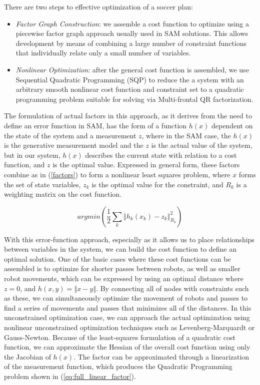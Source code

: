 \documentclass[a4paper, 10pt, conference]{ieeeconf}      %
\begin{document}
There are two steps to effective optimization of a soccer plan:
\begin{itemize}
 \item \textit{Factor Graph Construction}: we assemble a cost function to optimize using a piecewise factor graph approach usually used in SAM solutions.  This allows development by means of combining a large number of constraint functions that individually relate only a small number of variables.
\item \textit{Nonlinear Optimization}: after the general cost function is assembled, we use Sequential Quadratic Programming (SQP) to reduce the a system with an arbitrary smooth nonlinear cost function and constraint set to a quadratic programming problem suitable for solving via Multi-frontal QR factorization.  
 \end{itemize}

The formulation of actual factors in this approach, as it derives from the need to define an error function in SAM, has the form of a function $h(x)$ dependent on the state of the system and a measurement $z$, where in the SAM case, the $h(x)$ is the generative measurement model and the $z$ is the actual value of the system, but in our system, $h(x)$ describes the current state with relation to a cost function, and $z$ is the optimal value.  Expressed in general form, these factors combine as in (\ref{factors}) to form a nonlinear least squares problem, where $x$ forms the set of state variables, $z_{k}$ is the optimal value for the constraint, and $R_{k}$ is a weighting matrix on the cost function.

\begin{equation} \label{factors}
 argmin(\frac{1}{2}\sum_{k}\left\Vert h_{k}(x_{k})-z_{k}\right\Vert _{R_{k}}^{2})
\end{equation} 

With this error-function approach, especially as it allows us to place relationships between variables in the system, we can build the cost function to define an optimal solution.  One of the basic cases where these cost functions can be assembled is to optimize for shorter passes between robots, as well as smaller robot movements, which can be expressed by using an optimal distance where $z=0$, and $h(x,y)=\left\Vert x-y \right\Vert$.  By connecting all of nodes with constraints such as these, we can simultaneously optimize the movement of robots and passes to find a series of movements and passes that minimizes all of the distances.  In this unconstrained optimization case, we can approach the actual optimization using nonlinear unconstrained optimization techniques such as Levenberg-Marquardt or Gauss-Newton. Because of the least-squares formulation of a quadratic cost function, we can approximate the Hessian of the overall cost function using only the Jacobian of $h(x)$.  The factor can be approximated through a linearization of the measurement function, which produces the Quadratic Programming problem shown in (\ref{eq:full_linear_factor}).  
\end{document}
